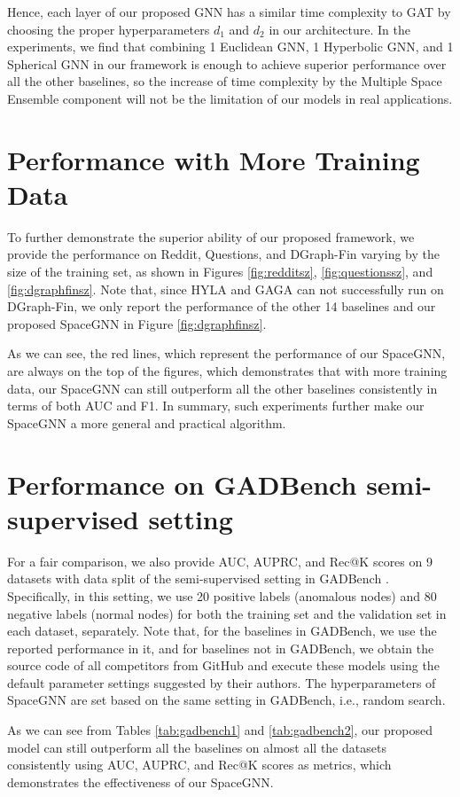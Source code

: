 {Hence, each layer of our proposed GNN has a similar time complexity to GAT by choosing the proper hyperparameters $d_1$ and $d_2$ in our architecture. In the experiments, we find that combining 1 Euclidean GNN, 1 Hyperbolic GNN, and 1 Spherical GNN in our framework is enough to achieve superior performance over all the other baselines, so the increase of time complexity by the Multiple Space Ensemble component will not be the limitation of our models in real applications. 
}

\section{Performance with More Training Data}
\label{subsec:moredata}

{ 




\update To further demonstrate the superior ability of our proposed framework, we provide the performance on Reddit, Questions, and DGraph-Fin varying by the size of the training set, as shown in Figures \ref{fig:redditsz}, \ref{fig:questionssz}, and \ref{fig:dgraphfinsz}. Note that, since HYLA and GAGA can not successfully run on DGraph-Fin, we only report the performance of the other 14 baselines and our proposed SpaceGNN in Figure \ref{fig:dgraphfinsz}. 

As we can see, the red lines, which represent the performance of our SpaceGNN, are always on the top of the figures, which demonstrates that with more training data, our SpaceGNN can still outperform all the other baselines consistently in terms of both AUC and F1. In summary, such experiments further make our SpaceGNN a more general and practical algorithm.
}

\section{Performance on GADBench \citep{gadbench23tang} semi-supervised setting}
\label{subsec:gadbench}
{\update 




For a fair comparison, we also provide AUC, AUPRC, and Rec@K scores on 9 datasets with data split of the semi-supervised setting in GADBench \citep{gadbench23tang}. Specifically, in this setting, we use 20 positive labels (anomalous nodes) and 80 negative labels (normal nodes) for both the training set and the validation set in each dataset, separately. Note that, for the baselines in GADBench, we use the reported performance in it, and for baselines not in GADBench, we obtain the source code of all competitors from GitHub and execute these models using the default parameter settings suggested by their authors. The hyperparameters of SpaceGNN are set based on the same setting in GADBench, i.e., random search.

As we can see from Tables \ref{tab:gadbench1} and \ref{tab:gadbench2}, our proposed model can still outperform all the baselines on almost all the datasets consistently using AUC, AUPRC, and Rec@K scores as metrics, which demonstrates the effectiveness of our SpaceGNN. 
}

